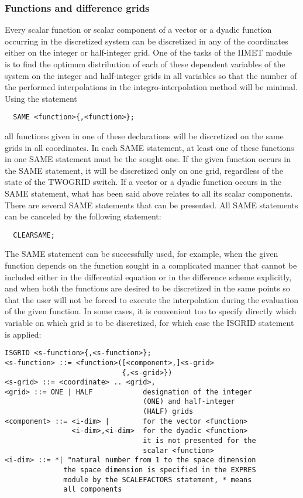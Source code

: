 \subsubsection{Functions and difference grids}


     Every scalar function or scalar component of a  vector or  a dyadic
function occurring  in the  discretized system can be discretized in any
of the coordinates either on the  integer or  half-integer grid.  One of
the tasks  of the  IIMET module  is to  find the optimum distribution of
each of these dependent variables  of  the  system  on  the  integer and
half-integer grids  in all variables so that the number of the performed
interpolations in the integro-interpolation method will be minimal.
     Using the statement
\begin{verbatim}
  SAME <function>{,<function>};
\end{verbatim}
all functions given in one of these declarations will be  discretized on
the same  grids in all coordinates. In each SAME statement, at least one
of these functions in one SAME statement must be the sought one.  If the
given function occurs in the SAME statement, it will be discretized only
on one grid, regardless of the state of the TWOGRID switch. If  a vector
or a  dyadic function  occurs in  the SAME statement, what has been said
above relates to all  its  scalar  components.  There  are  several SAME
statements that can be presented. All SAME statements can be canceled by
the following statement:
\begin{verbatim}
  CLEARSAME;
\end{verbatim}
The SAME statement can be successfully used, for example, when the given
function depends  on the  function sought  in a  complicated manner that
cannot be  included  either  in  the  differential  equation  or  in the
difference scheme explicitly, and when both the functions are desired to
be discretized in the same points so that the user will not be forced to
execute the interpolation during the evaluation of the given function.
     In  some  cases,  it  is  convenient  too to specify directly which
variable on which grid is to be discretized,  for which  case the ISGRID
statement is applied:
{\small\begin{verbatim}
ISGRID <s-function>{,<s-function>};
<s-function> ::= <function>([<component>,]<s-grid>
                            {,<s-grid>})
<s-grid> ::= <coordinate> .. <grid>,
<grid> ::= ONE | HALF            designation of the integer
                                 (ONE) and half-integer
                                 (HALF) grids
<component> ::= <i-dim> |        for the vector <function>
                <i-dim>,<i-dim>  for the dyadic <function>
                                 it is not presented for the
                                 scalar <function>
<i-dim> ::= *| "natural number from 1 to the space dimension
              the space dimension is specified in the EXPRES
              module by the SCALEFACTORS statement, * means
              all components
\end{verbatim}}
